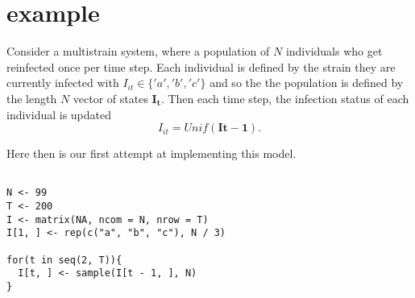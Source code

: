 \documentclass{article}
\begin{document}
\section{ example}

Consider a multistrain system, where a population of $N$ individuals who get reinfected once per time step. 
Each individual is defined by the strain they are currently infected with $I_{it} \in \{'a', 'b', 'c'\}$ and so the the population is defined by the length $N$ vector of states $\mathbf{I_t}$.
Then each time step, the infection status of each individual is updated
$$I_{it} = Unif(\mathbf{I{t-1}}).$$

Here then is our first attempt at implementing this model.

\begin{lstlisting}

N <- 99
T <- 200
I <- matrix(NA, ncom = N, nrow = T)
I[1, ] <- rep(c("a", "b", "c"), N / 3)

for(t in seq(2, T)){
  I[t, ] <- sample(I[t - 1, ], N)
}
\end{lstlisting}
\end{document}

